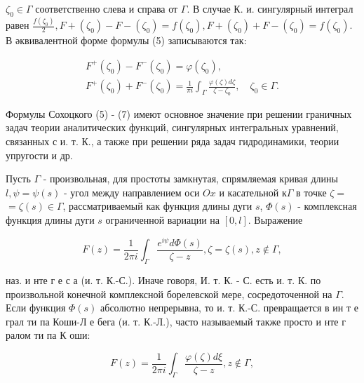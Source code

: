 \documentclass[10pt]{article}
\begin{document}
$\zeta_{0} \in \Gamma$ соответственно слева и справа от $\Gamma$. В случае К. и. сингулярный интеграл равен $\frac{f\left(\zeta_{0}\right)}{2}, F+\left(\zeta_{0}\right)-F-\left(\zeta_{0}\right)=f\left(\zeta_{0}\right), F+\left(\zeta_{0}\right)+F-\left(\zeta_{0}\right)=f\left(\zeta_{0}\right)$. В әквивалентной форме формулы (5) записываются так:



\[

\begin{gathered}

F^{+}\left(\zeta_{0}\right)-F^{-}\left(\zeta_{0}\right)=\varphi\left(\zeta_{0}\right), \\

F^{+}\left(\zeta_{0}\right)+F^{-}\left(\zeta_{0}\right)=\frac{1}{\pi i} \int_{\Gamma} \frac{\varphi(\zeta) d \zeta}{\zeta-\zeta_{0}}, \quad \zeta_{0} \in \Gamma .

\end{gathered}

\]



Формулы Сохоцкого (5) - (7) имеют основное значение при решении граничных задач теории аналитических функций, сингулярных интегральных уравнений, связанных с и. т. К., а также при решении ряда задач гидродинамики, теории упругости и др.



Пусть $\Gamma$ - произвольная, для простоты замкнутая, спрямляемая кривая длины $l, \psi=\psi(s)$ - угол между направлением оси $O x$ и касательной $к \Gamma$ в точке $\zeta=$ $=\zeta(s) \in \Gamma$, рассматриваемый как функция длины дуги $s$, $\Phi(s)$ - комплексная функция длины дуги $s$ ограниченной вариации на $[0, l]$. Выражение



\[

F(z)=\frac{1}{2 \pi i} \int_{\Gamma} \frac{e^{i \psi} d \Phi(s)}{\zeta-z}, \zeta=\zeta(s), z \notin \Gamma,

\]



наз. и нте г е с а (и. т. К.-С.). Иначе говоря, И. т. К. - С. есть и. т. К. по произвольной конечной комплексной борелевской мере, сосредоточенной на $\Gamma$. Если функция $\Phi(s)$ абсолютно непрерывна, то и. т. К.-С. превращается в ин т е грал ти па Коши-Л е бега (и. т. К.-Л.), часто называемый также просто и нте г ралом ти па К оши:



\[

F(z)=\frac{1}{2 \pi i} \int_{\Gamma} \frac{\varphi(\zeta) d \xi}{\zeta-z}, z \notin \Gamma,

\]
\end{document}
